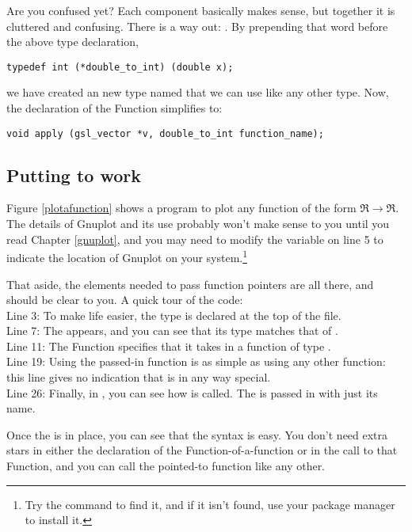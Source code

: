 Are you confused yet? Each component basically makes sense, but together
it is cluttered and confusing. There is a way out: . By prepending
that word before the above type declaration,
\begin{lstlisting}
typedef int (*double_to_int) (double x);
\end{lstlisting}
we have created an new type named  that we can
use like any other type. Now, the declaration of the  Function
simplifies to:
\begin{lstlisting}[emph={double_to_int,gsl_vector}]
void apply (gsl_vector *v, double_to_int function_name);
\end{lstlisting}

\subsection{Putting  to work}
Figure \ref{plotafunction} shows a program to plot any function of the
form $\Re\to\Re$. The
details of Gnuplot and its use probably won't make sense to you until
you read Chapter \ref{gnuplot}, and you may need to modify the
 variable on line 5 to indicate the location of Gnuplot on
your system.\footnote{Try the command  to find it,
and if it isn't found, use your package manager to install it.}

That aside, the elements needed to pass function pointers are all there,
and should be clear to you. A quick tour of the code:\\
Line 3: To make life easier, the  type is
declared at the top of the file. \\
Line 7: The  appears, and you can see that its type matches that of . \\
Line 11: The  Function specifies that it takes in a function of type
.\\
Line 19: Using the passed-in function is as simple
as using any other function: this line  gives no
indication that  is in any way special.  \\
Line 26: Finally, in ,
you can see how  is called. The 
is passed in with just its name.

Once the  is in place, you can see that the syntax is 
easy. You don't need extra stars in either the declaration of the
Function-of-a-function or in the call to that Function, and you can call
the pointed-to function like any other. 

